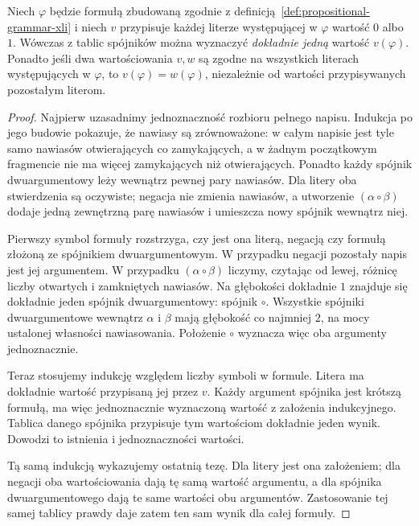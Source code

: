 \begin{twierdzenie}
\label{thm:valuation-well-defined-xli}
Niech $\varphi$ będzie formułą zbudowaną zgodnie
z definicją~\ref{def:propositional-grammar-xli} i niech
$v$ przypisuje każdej literze występującej w $\varphi$
wartość $0$ albo $1$. Wówczas z tablic spójników można
wyznaczyć \emph{dokładnie jedną} wartość $v(\varphi)$.
Ponadto jeśli dwa wartościowania $v,w$ są zgodne na wszystkich
literach występujących w $\varphi$, to $v(\varphi)=w(\varphi)$,
niezależnie od wartości przypisywanych pozostałym literom.
\end{twierdzenie}
\begin{proof}
Najpierw uzasadnimy jednoznaczność rozbioru pełnego napisu.
Indukcja po jego budowie pokazuje, że nawiasy są zrównoważone:
w całym napisie jest tyle samo nawiasów otwierających co
zamykających, a w żadnym początkowym fragmencie nie ma więcej
zamykających niż otwierających. Ponadto każdy spójnik
dwuargumentowy leży wewnątrz pewnej pary nawiasów.
Dla litery oba stwierdzenia są oczywiste; negacja nie zmienia
nawiasów, a utworzenie $(\alpha\circ\beta)$ dodaje jedną
zewnętrzną parę nawiasów i umieszcza nowy spójnik wewnątrz niej.

Pierwszy symbol formuły rozstrzyga, czy jest ona literą,
negacją czy formułą złożoną ze spójnikiem dwuargumentowym.
W przypadku negacji pozostały napis jest jej argumentem.
W przypadku $(\alpha\circ\beta)$ liczymy, czytając od lewej,
różnicę liczby otwartych i zamkniętych nawiasów.
Na głębokości dokładnie $1$ znajduje się dokładnie jeden
spójnik dwuargumentowy: spójnik $\circ$. Wszystkie spójniki
dwuargumentowe wewnątrz $\alpha$ i $\beta$ mają głębokość
co najmniej $2$, na mocy ustalonej własności nawiasowania.
Położenie $\circ$ wyznacza więc oba argumenty jednoznacznie.

Teraz stosujemy indukcję względem liczby symboli w formule.
Litera ma dokładnie wartość przypisaną jej przez $v$.
Każdy argument spójnika jest krótszą formułą, ma więc
jednoznacznie wyznaczoną wartość z założenia indukcyjnego.
Tablica danego spójnika przypisuje tym wartościom dokładnie
jeden wynik. Dowodzi to istnienia i jednoznaczności wartości.

Tą samą indukcją wykazujemy ostatnią tezę. Dla litery jest
ona założeniem; dla negacji oba wartościowania dają tę samą
wartość argumentu, a dla spójnika dwuargumentowego dają
te same wartości obu argumentów. Zastosowanie tej samej
tablicy prawdy daje zatem ten sam wynik dla całej formuły.
\end{proof}


